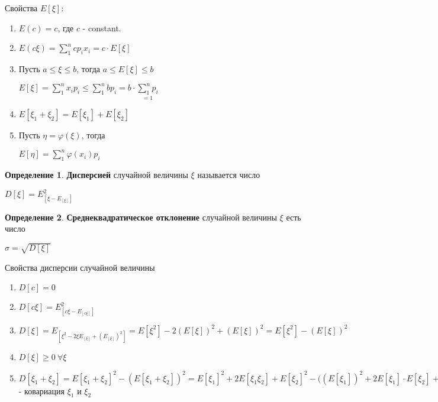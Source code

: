 \documentclass[a4paper, 12pt]{article}
\theoremstyle{definition}
\newtheorem{Definition}{Определение}
\begin{document}
    \begin{center}
        Свойства \(E[\xi]\):
        \begin{enumerate}
            \item
                \(E(c) = c\), где \(c\) - constant.
            \item
                \(E(c\xi) = \sum^{n}_{1} c p_i x_i = c \cdot E[\xi]\)
            \item
                Пусть \(a \le \xi \le b\), тогда \(a \le E[\xi] \le b\)

                \(E[\xi] = \sum^{n}_{1} x_i p_i \le \sum^{n}_{1} b p_i = b \cdot \underset{= 1}{\sum^{n}_{1} p_i}\)
            \item
                \(E[\xi_1 + \xi_2] = E[\xi_1] + E[\xi_2]\)
            \item
                Пусть \(\eta = \varphi(\xi)\), тогда


                \(E[\eta] = \sum^{n}_{1} \varphi(x_i) p_i\)
        \end{enumerate}
    \end{center}

    \begin{Definition}
        \textbf{Дисперсией} случайной величины \(\xi\) называется число

        \(D[\xi] = E_{[\xi - E_{[\xi]}]}^2\)
    \end{Definition}

    \begin{Definition}
        \textbf{Среднеквадратическое отклонение} случайной величины \(\xi\) есть число

        \(\sigma = \sqrt{D[\xi]}\)
    \end{Definition}

    \begin{center}
        Свойства дисперсии случайной величины

        \begin{enumerate}
            \item
                \(D[c] = 0\)
            \item
                \(D[c \xi] = E_{[c \xi - E_{[c \xi]} ]}^2\)
            \item
                \(D[\xi] = E_{[\xi^2 - 2 \xi E_{[\xi]} + ( E_{[\xi]} )^2]} =
                E[\xi^2] - 2(E[\xi])^2 + (E[\xi])^2 = E[\xi^2] - (E[\xi])^2\)
            \item
                \(D[\xi] \ge 0 \ \forall \xi\)
            \item
                \(D[\xi_1 + \xi_2] = E[\xi_1 + \xi_2]^2 - ( E[\xi_1 + \xi_2] )^2 =
                E[\xi_1]^2 + 2E[\xi_1 \xi_2] + E[\xi_2]^2 - \big( (E[\xi_1])^2 + 2E[\xi_1] \cdot E[\xi_2] + (E[\xi_2])^2 \big) = 
                D[\xi_1] + D[\xi_2] + 2 (E[\xi_1 \xi_2] - E[\xi_1] \cdot E[\xi_2]) = cov(\xi_1, \xi_2)\) - ковариация \(\xi_1\) и \(\xi_2\)
        \end{enumerate}
    \end{center}
\end{document}
